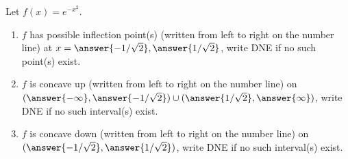 \documentclass{ximera}
\author{Gregory Hartman \and Matthew Carr}
\begin{document}
\begin{exercise}






Let $f(x)=e^{-x^{2}}$.
\begin{enumerate}
\item		$f$ has possible inflection point(s) (written from left to right on the number line) at $x=\answer{-1/\sqrt{2}},\answer{1/\sqrt{2}}$, write DNE if no such point(s) exist.
\item		$f$ is concave up (written from left to right on the number line) on $(\answer{-\infty},\answer{-1/\sqrt{2}})\cup(\answer{1/\sqrt{2}},\answer{\infty})$, write DNE if no such interval(s) exist.
\item		$f$ is concave down (written from left to right on the number line) on $(\answer{-1/\sqrt{2}},\answer{1/\sqrt{2}})$, write DNE if no such interval(s) exist.
\end{enumerate}

\end{exercise}
\end{document}

